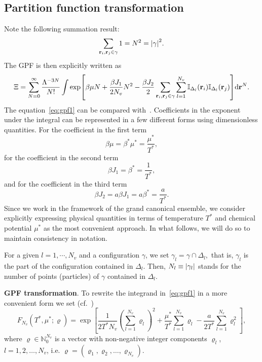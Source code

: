 \documentclass[12pt]{article}
\numberwithin{equation}{section}
\begin{document}
	\subsection{Partition function transformation}
	Note the following summation result:
	\begin{equation}
		\sum_{\vb{r}_i,\vb{r}_j \in \gamma} 1 = N^2 = \abs{\gamma}^2.
	\end{equation}
	The GPF is then explicitly written as
	\begin{equation}
		\label{eq:gpf1}
		\Xi = \sum_{N=0}^{\infty} \frac{\Lambda^{-3N}}{N!}
		\int
		\exp[\beta\mu N + \frac{\beta J_1}{2N_{v}} N^2 - \frac{\beta J_2}{2} \sum_{\vb{r}_i,\vb{r}_j \in \gamma} \sum_{l=1}^{N_v} \mathbb{I}_{\Delta_l}(\vb{r}_i)\mathbb{I}_{\Delta_l}(\vb{r}_j)] {\rm d} \vb{r}^N.
	\end{equation}
	The equation~\eqref{eq:gpf1} can be compared with~\cite[(2.5)]{KKD20}. Coefficients in the exponent under the integral can be represented in a few different forms using dimensionless quantities. For the coefficient in the first term
	\begin{equation*}
		\beta\mu = \beta^*\mu^* = \frac{\mu^*}{T^*},
	\end{equation*}
	for the coefficient in the second term
	\begin{equation*}
		\beta J_1 = \beta^* = \frac{1}{T^*},
	\end{equation*}
	and for the coefficient in the third term
	\begin{equation*}
		\beta J_2 = a \beta J_1 = a \beta^* = \frac{a}{T^*}.
	\end{equation*}
	Since we work in the framework of the grand canonical ensemble, we consider explicitly expressing physical quantities in terms of temperature $T^*$ and chemical potential $\mu^*$ as the most convenient approach. In what follows, we will do so to maintain consistency in notation.
	
	For a given $l = 1, \cdots , N_v$ and a configuration $\gamma$, we set $\gamma_l = \gamma \cap \Delta_l,$ that is, $\gamma_l$ is the part of the configuration contained in $\Delta_l$. Then, $N_l \equiv \abs{\gamma_l}$ stands for the number of points (particles) of $\gamma$ contained in $\Delta_l$.
	
	\textbf{GPF transformation}. To rewrite the integrand in~\eqref{eq:gpf1} in a more convenient form we set (cf.~\cite[eq.~(2.7)]{KKD20})
	\begin{equation}
		F_{N_v}(T^*, \mu^*; \varrho) = \exp[\frac{1}{2T^*N_v}\left(\sum_{l=1}^{N_v} \varrho_l\right)^2 + \frac{\mu^*}{T^*}\sum_{l=1}^{N_v} \varrho_l - \frac{a}{2T^*} \sum_{l=1}^{N_v} \varrho_l^2],
	\end{equation}
	where $\varrho \in \mathbb{N}_0^{N_v}$ is a vector with non-negative integer components $\varrho_l$, $l=1, 2, \ldots , N_v$, i.e. $\varrho = (\varrho_1, \varrho_2, \ldots, \varrho_{N_{v}})$.
	
\end{document}
